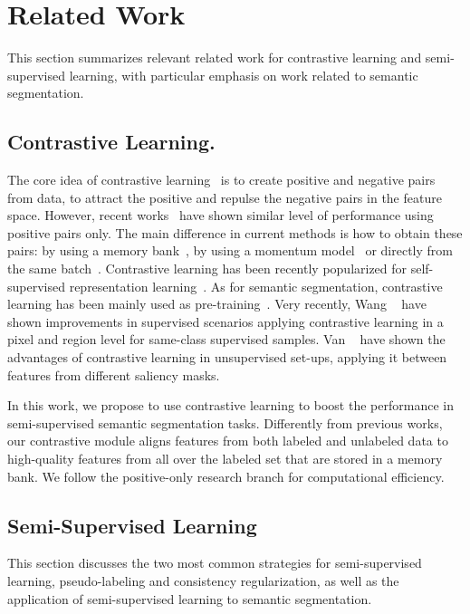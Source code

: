 \documentclass[10pt,twocolumn,letterpaper]{article}
\begin{document}
 

\section{Related Work}
This section summarizes relevant related work for contrastive learning and semi-supervised learning, with particular emphasis on work related to semantic segmentation.


\subsection{Contrastive Learning.}
The core idea of contrastive learning~\cite{hadsell2006dimensionality} is to create positive and negative pairs from data, to attract the positive and repulse the negative pairs in the feature space. However, recent works~\cite{chen2020exploring, grill2020bootstrap, huang2021self} have shown similar level of performance using positive pairs only. The main difference in current methods is how to obtain these pairs: by using a memory bank~\cite{wu2018unsupervised}, by using a momentum model~\cite{chen2020improved} or directly from the same batch~\cite{chen2020simple}.
Contrastive learning has been recently popularized for self-supervised representation learning~\cite{chen2020improved, grill2020bootstrap, wu2018unsupervised, ye2019unsupervised}.
As for semantic segmentation, contrastive learning has been mainly used as pre-training~\cite{wang2020dense, xie2020pointcontrast, xie2020propagate}.
Very recently, Wang \etal~\cite{wang2021exploring} have shown improvements in supervised scenarios applying contrastive learning in a pixel and region level for same-class supervised samples. Van \etal~\cite{van2021unsupervised} have shown the advantages of contrastive learning in unsupervised set-ups, applying it between features from different saliency masks.

In this work, we propose to use contrastive learning to boost the performance in semi-supervised semantic segmentation tasks.
Differently from previous works, our contrastive module aligns features from both labeled and unlabeled data to high-quality features from all over the labeled set that are stored in a memory bank. We follow the positive-only research branch for computational efficiency.

\subsection{Semi-Supervised Learning}
This section discusses the two most common strategies for semi-supervised learning, pseudo-labeling and consistency regularization, as well as the application of semi-supervised learning to semantic segmentation. 
\end{document}
